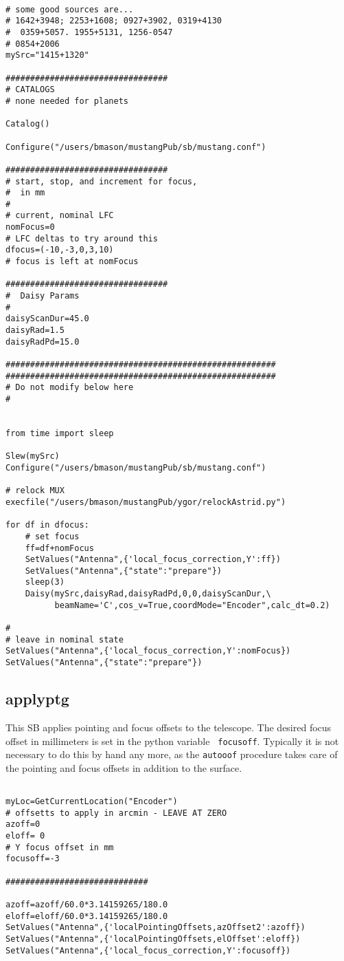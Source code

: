 \begin{lstlisting}

# some good sources are...
# 1642+3948; 2253+1608; 0927+3902, 0319+4130
#  0359+5057. 1955+5131, 1256-0547
# 0854+2006
mySrc="1415+1320"

#################################
# CATALOGS
# none needed for planets

Catalog()

Configure("/users/bmason/mustangPub/sb/mustang.conf")

#################################
# start, stop, and increment for focus,
#  in mm
#
# current, nominal LFC
nomFocus=0
# LFC deltas to try around this
dfocus=(-10,-3,0,3,10)
# focus is left at nomFocus

#################################
#  Daisy Params
#
daisyScanDur=45.0
daisyRad=1.5
daisyRadPd=15.0

#######################################################
#######################################################
# Do not modify below here
#


from time import sleep

Slew(mySrc)							       
Configure("/users/bmason/mustangPub/sb/mustang.conf")

# relock MUX
execfile("/users/bmason/mustangPub/ygor/relockAstrid.py")

for df in dfocus:
    # set focus
    ff=df+nomFocus
    SetValues("Antenna",{'local_focus_correction,Y':ff})
    SetValues("Antenna",{"state":"prepare"})
    sleep(3)
    Daisy(mySrc,daisyRad,daisyRadPd,0,0,daisyScanDur,\
          beamName='C',cos_v=True,coordMode="Encoder",calc_dt=0.2)

#
# leave in nominal state
SetValues("Antenna",{'local_focus_correction,Y':nomFocus})
SetValues("Antenna",{"state":"prepare"})

\end{lstlisting}

\subsection{applyptg}

This SB applies pointing and focus offsets to the telescope. The
desired focus offset in millimeters is set in the python variable {\tt
focusoff}. Typically it is not necessary to do this by hand any more,
as the {\tt autooof} procedure takes care of the pointing and focus
offsets in addition to the surface.

\begin{lstlisting}

myLoc=GetCurrentLocation("Encoder")
# offsetts to apply in arcmin - LEAVE AT ZERO
azoff=0
eloff= 0
# Y focus offset in mm
focusoff=-3

#############################

azoff=azoff/60.0*3.14159265/180.0
eloff=eloff/60.0*3.14159265/180.0
SetValues("Antenna",{'localPointingOffsets,azOffset2':azoff})
SetValues("Antenna",{'localPointingOffsets,elOffset':eloff})
SetValues("Antenna",{'local_focus_correction,Y':focusoff})

\end{lstlisting}


